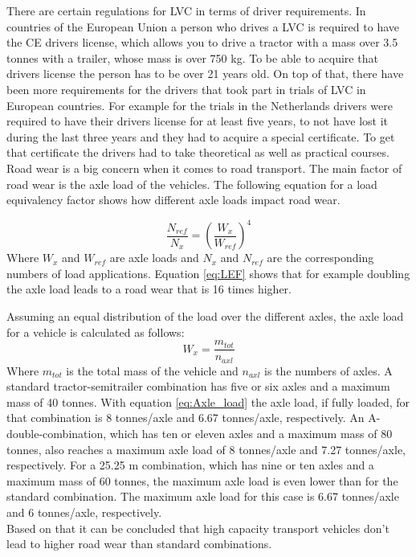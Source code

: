 \documentclass[ExampleMasters.tex]{subfiles}
\begin{document}
There are certain regulations for LVC in terms of driver requirements. In countries of the European Union a person who drives a LVC is required to have the CE drivers license, which allows you to drive a tractor with a  mass over 3.5 tonnes with a trailer, whose mass is over 750 kg. To be able to acquire that drivers license the person has to be over 21 years old. \cite{EU_driving_licenses} 
On top of that, there have been more requirements for the drivers that took part in trials of LVC in European countries. For example for the trials in the Netherlands drivers were required to have their drivers license for at least five years, to not have lost it during the last three years and they had to acquire a special certificate. To get that certificate the drivers had to take theoretical as well as practical courses.
\cite{LVC_test_netherlands} \\

Road wear is a big concern when it comes to road transport. The main factor of road wear is the axle load of the vehicles. The following equation for a load equivalency factor shows how different axle loads impact road wear.   

\begin{equation}
\frac{N_{ref}}{N_x}=\left(\frac{W_x}{W_{ref}}\right)^4
\label{eq:LEF}
\end{equation}
Where $W_x$ and $W_{ref}$ are axle loads and $N_x$ and $N_{ref}$ are the corresponding numbers of load applications.\cite{road_wear} Equation \eqref{eq:LEF} shows that for example doubling the axle load leads to a road wear that is 16 times higher.

Assuming an equal distribution of the load over the different axles, the axle load for a vehicle is calculated as follows:\\
\begin{equation}
W_x=\frac{m_{tot}}{n_{axl}}
\label{eq:Axle_load}
\end{equation}
Where $m_{tot}$ is the total mass of the vehicle and $n_{axl}$ is the numbers of axles.
A standard tractor-semitrailer combination has five or six axles and a maximum mass of 40 tonnes.
With equation \eqref{eq:Axle_load} the axle load, if fully loaded, for that combination is 8 tonnes/axle and 6.67 tonnes/axle, respectively.
An A-double-combination, which has ten or eleven axles and a maximum mass of 80 tonnes, also reaches a maximum axle  load of 8 tonnes/axle and 7.27 tonnes/axle, respectively.
For a 25.25 m combination, which has nine or ten axles and a maximum mass of 60 tonnes, the maximum axle load is even lower than for the standard combination. The maximum axle load for this case is 6.67 tonnes/axle and 6 tonnes/axle, respectively.
\\Based on that it can be concluded that high capacity transport vehicles don't lead to higher road wear than standard combinations.
\end{document}

